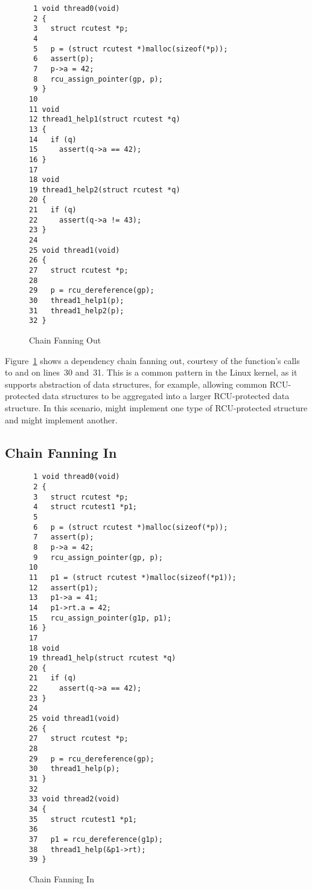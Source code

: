 \documentclass[letterpaper,twocolumn,10pt]{article}
\begin{document}
\begin{figure}[tbp]
{ \scriptsize
\begin{verbatim}
 1 void thread0(void)
 2 {
 3   struct rcutest *p;
 4
 5   p = (struct rcutest *)malloc(sizeof(*p));
 6   assert(p);
 7   p->a = 42;
 8   rcu_assign_pointer(gp, p);
 9 }
10
11 void
12 thread1_help1(struct rcutest *q)
13 {
14   if (q)
15     assert(q->a == 42);
16 }
17
18 void
19 thread1_help2(struct rcutest *q)
20 {
21   if (q)
22     assert(q->a != 43);
23 }
24
25 void thread1(void)
26 {
27   struct rcutest *p;
28
29   p = rcu_dereference(gp);
30   thread1_help1(p);
31   thread1_help2(p);
32 }
\end{verbatim}
}
\caption{Chain Fanning Out}
\label{fig:Chain Fanning Out}
\end{figure}

Figure~\ref{fig:Chain Fanning Out}
shows a dependency chain fanning out, courtesy of the 
function's calls to  and 
on lines~30 and~31.
This is a common pattern in the Linux kernel, as it supports
abstraction of data structures, for example, allowing common RCU-protected
data structures to be aggregated into a larger RCU-protected data
structure.
In this scenario,  might implement one type of
RCU-protected structure and  might implement
another.

\subsection{Chain Fanning In}
\label{sec:Chain Fanning In}

\begin{figure}[tbp]
{ \scriptsize
\begin{verbatim}
 1 void thread0(void)
 2 {
 3   struct rcutest *p;
 4   struct rcutest1 *p1;
 5
 6   p = (struct rcutest *)malloc(sizeof(*p));
 7   assert(p);
 8   p->a = 42;
 9   rcu_assign_pointer(gp, p);
10
11   p1 = (struct rcutest *)malloc(sizeof(*p1));
12   assert(p1);
13   p1->a = 41;
14   p1->rt.a = 42;
15   rcu_assign_pointer(g1p, p1);
16 }
17
18 void
19 thread1_help(struct rcutest *q)
20 {
21   if (q)
22     assert(q->a == 42);
23 }
24
25 void thread1(void)
26 {
27   struct rcutest *p;
28
29   p = rcu_dereference(gp);
30   thread1_help(p);
31 }
32
33 void thread2(void)
34 {
35   struct rcutest1 *p1;
36
37   p1 = rcu_dereference(g1p);
38   thread1_help(&p1->rt);
39 }
\end{verbatim}
}
\caption{Chain Fanning In}
\label{fig:Chain Fanning In}
\end{figure}
\end{document}
